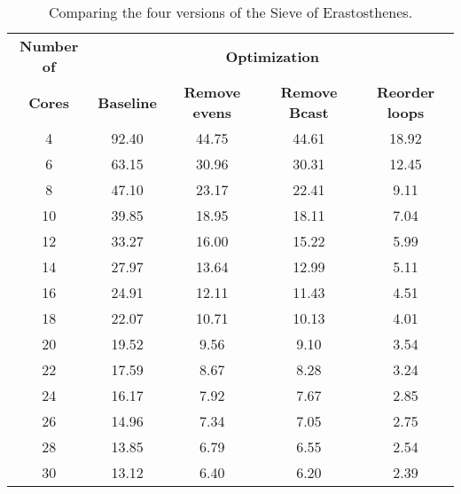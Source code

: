 \begin{table}[ht]
\centering
\begin{tabular}{ccccc}
  \toprule
  \textbf{Number of} & \multicolumn{4}{c}{\textbf{Optimization}} \\
 \textbf{Cores} & \textbf{Baseline} & \textbf{Remove evens} & \textbf{Remove Bcast} & \textbf{Reorder loops} \\
 \midrule
  4 & 92.40 & 44.75 & 44.61 & 18.92 \\ 
    6 & 63.15 & 30.96 & 30.31 & 12.45 \\ 
    8 & 47.10 & 23.17 & 22.41 & 9.11 \\ 
   10 & 39.85 & 18.95 & 18.11 & 7.04 \\ 
   12 & 33.27 & 16.00 & 15.22 & 5.99 \\ 
   14 & 27.97 & 13.64 & 12.99 & 5.11 \\ 
   16 & 24.91 & 12.11 & 11.43 & 4.51 \\ 
   18 & 22.07 & 10.71 & 10.13 & 4.01 \\ 
   20 & 19.52 & 9.56 & 9.10 & 3.54 \\ 
   22 & 17.59 & 8.67 & 8.28 & 3.24 \\ 
   24 & 16.17 & 7.92 & 7.67 & 2.85 \\ 
   26 & 14.96 & 7.34 & 7.05 & 2.75 \\ 
   28 & 13.85 & 6.79 & 6.55 & 2.54 \\ 
   30 & 13.12 & 6.40 & 6.20 & 2.39 \\ 
   \bottomrule
\end{tabular}
\caption{Comparing the four versions of the Sieve of Erastosthenes.} 
\label{tab:table}
\end{table}
